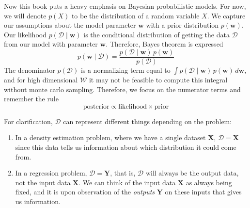 \documentclass{article}
\theoremstyle{definition}
\begin{document}
Now this book puts a heavy emphasis on Bayesian probabilistic models. For now, we will denote $p(X)$ to be the distribution of a random variable $X$. We capture our assumptions about the model parameter $\mathbf{w}$ with a prior distribution $p(\mathbf{w})$. Our likelihood $p(\mathcal{D} \mid \mathbf{w})$ is the conditional distribution of getting the data $\mathcal{D}$ from our model with parameter $\mathbf{w}$. Therefore, Bayes theorem is expressed 
\[p(\mathbf{w} \mid \mathcal{D}) = \frac{p(\mathcal{D} \mid \mathbf{w}) \, p(\mathbf{w})}{p(\mathcal{D})}\]
The denominator $p(\mathcal{D})$ is a normalizing term equal to $\int p(\mathcal{D} \mid \mathbf{w}) \, p(\mathbf{w}) \,d\mathbf{w}$, and for high dimensional $\mathcal{W}$ it may not be feasible to compute this integral without monte carlo sampling. Therefore, we focus on the numerator terms and remember the rule 
\[\text{posterior} \propto \text{likelihood} \times \text{prior}\]

For clarification, $\mathcal{D}$ can represent different things depending on the problem: 
\begin{enumerate}
    \item In a density estimation problem, where we have a single dataset $\mathbf{X}$, $\mathcal{D} = \mathbf{X}$ since this data tells us information about which distribution it could come from. 
    \item In a regression problem, $\mathcal{D} = \mathbf{Y}$, that is, $\mathcal{D}$ will always be the output data, not the input data $\mathbf{X}$. We can think of the input data $\mathbf{X}$ as always being fixed, and it is upon observation of the \textit{outputs} $\mathbf{Y}$ on these inputs that gives us information. 
\end{enumerate}
\end{document}
